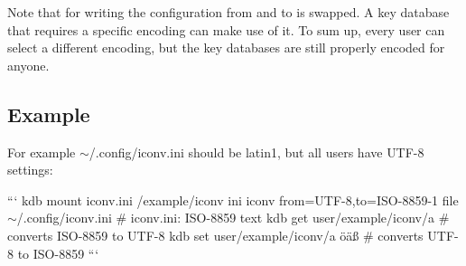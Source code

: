 Note that for writing the configuration {\ttfamily from} and {\ttfamily to} is swapped. A key database that requires a specific encoding can make use of it. To sum up, every user can select a different encoding, but the key databases are still properly encoded for anyone.

\subsection*{Example}

For example {\ttfamily $\sim$/.config/iconv.\+ini} should be {\ttfamily latin1}, but all users have {\ttfamily U\+T\+F-\/8} settings\+:

``` kdb mount iconv.\+ini /example/iconv ini iconv from=U\+T\+F-\/8,to=I\+S\+O-\/8859-\/1 file $\sim$/.config/iconv.\+ini \# iconv.\+ini\+: I\+S\+O-\/8859 text kdb get user/example/iconv/a \# converts I\+S\+O-\/8859 to U\+T\+F-\/8 kdb set user/example/iconv/a öäß \# converts U\+T\+F-\/8 to I\+S\+O-\/8859 ``` 